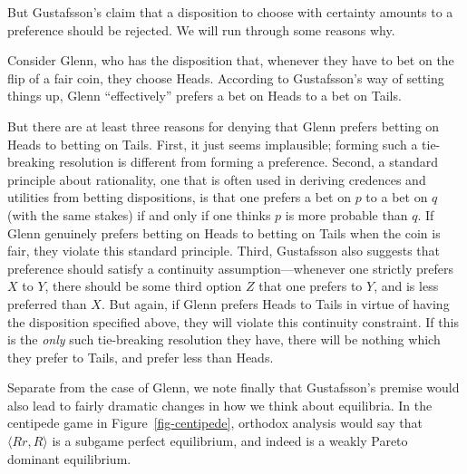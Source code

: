 \documentclass[
  11pt,
  letterpaper]{article}
\begin{document}


But Gustafsson's claim that a disposition to choose with certainty amounts to a preference should be rejected. We will run through some reasons why. 

Consider Glenn, who has the disposition that, whenever they have to bet on the flip of a fair coin, they choose Heads. According to Gustafsson's way of setting things up, Glenn ``effectively'' prefers a bet on Heads to a bet on Tails.

But there are at least three reasons for denying that Glenn prefers betting on Heads to betting on Tails. First, it just seems implausible; forming such a tie-breaking resolution is different from forming a preference. Second, a standard principle about rationality, one that is often used in deriving credences and utilities from betting dispositions, is that one prefers a bet on $p$ to a bet on $q$ (with the same stakes) if and only if one thinks $p$ is more probable than $q$. If Glenn genuinely prefers betting on Heads to betting on Tails when the coin is fair, they violate this standard principle. Third, Gustafsson also suggests that preference should satisfy a continuity assumption---whenever one strictly prefers $X$ to $Y$, there should be some third option $Z$ that one prefers to $Y$, and is less preferred than $X$. But again, if Glenn prefers Heads to Tails in virtue of having the disposition specified above, they will violate this continuity constraint. If this is the \emph{only} such tie-breaking resolution they have, there will be nothing which they prefer to Tails, and prefer less than Heads. 

Separate from the case of Glenn, we note finally that Gustafsson's premise would also lead to fairly dramatic changes in how we think about equilibria. In the centipede game in Figure~\ref{fig-centipede}, orthodox analysis would say that $\langle Rr, R \rangle$ is a subgame perfect equilibrium, and indeed is a weakly Pareto dominant equilibrium.
\end{document}
